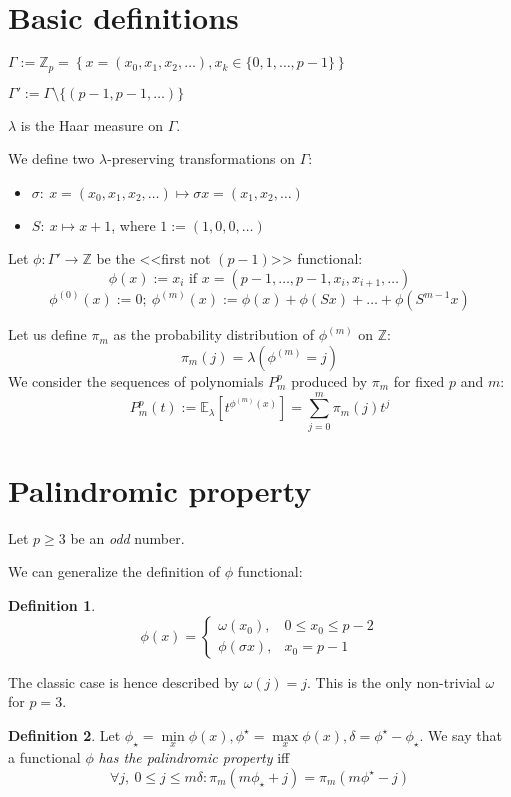 \documentclass[a4paper]{article}
\theoremstyle{plain}
\theoremstyle{definition}
\newtheorem{definition}{Definition}
\begin{document}
\section{Basic definitions}
$\Gamma := \mathbb{Z}_p = \left\{x = \left(x_0, x_1, x_2, \ldots \right), x_k \in \{0, 1, \ldots, p - 1\} \right\}$

$\Gamma' := \Gamma \setminus \{(p-1,p-1,\ldots)\}$

$\lambda$ is the Haar measure on $\Gamma$.

    We define two $\lambda$-preserving transformations on $\Gamma$:
    \begin{itemize}
    \item $\sigma:\ x=\left(x_0, x_1, x_2, \ldots \right) \mapsto \sigma x = \left(x_1, x_2, \ldots \right)$
    \item $S:\ x \mapsto x + 1$, where $1:=(1,0,0,\ldots)$
    \end{itemize}
    Let $\phi: \Gamma' \rightarrow \mathbb{Z}$ be the <<first not $(p-1)$>> functional:\\
    \[\phi(x):=x_i\text{ if }x=(p-1, \ldots, p-1, x_i, x_{i+1}, \ldots)\]
    \[\phi^{(0)}(x):=0;\ \phi^{(m)}(x):=\phi(x)+\phi(Sx)+\ldots+\phi(S^{m-1}x)\]

Let us define $\pi_m$ as the probability distribution of $\phi^{(m)}$ on $\mathbb{Z}$:
    \[\pi_m(j) = \lambda(\phi^{(m)}=j)\]
    We consider the sequences of polynomials $P_m^p$ produced by $\pi_m$ for fixed $p$ and $m$:
    \[P_m^p(t):= \mathbb{E}_\lambda\left[ t^{\phi^{(m)}(x)}\right] = \sum\limits_{j=0}^m \pi_m(j) t^j \]
\section{Palindromic property}
Let $p \ge 3$ be an \textit{odd} number.

We can generalize the definition of $\phi$ functional:
\begin{definition}
    $$
    \phi(x) = \begin{cases}
                    \omega(x_0), & 0 \le x_0 \le p - 2 \\
                    \phi(\sigma x), & x_0 = p - 1
                \end{cases}
    $$
\end{definition}
    The classic case is hence described by $\omega(j)=j$. This is the only non-trivial $\omega$ for $p=3$. \\
    
\begin{definition}
Let $\phi_\star = \min\limits_x \phi(x), \phi^\star = \max\limits_x \phi(x), \delta=\phi^\star - \phi_\star$. We say that a functional $\phi$  \textit{has the palindromic property} iff 
$$
\forall j,\ 0 \le j \le m\delta:   \pi_m(m\phi_\star + j)=\pi_m(m\phi^\star-j)
$$
\end{definition}
    
\end{document}
